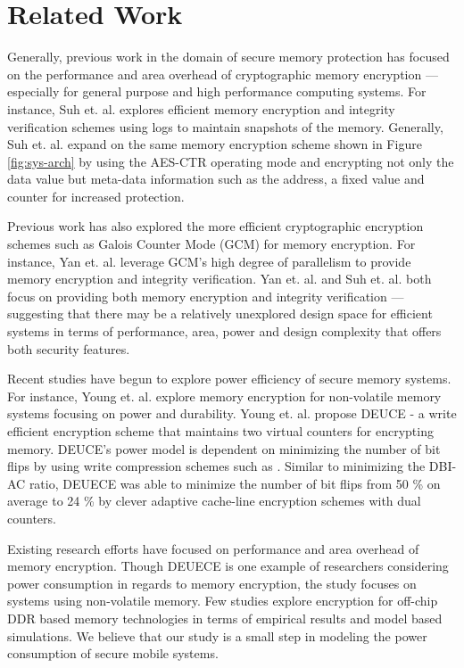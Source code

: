 \section{Related Work}
\label{sec-related}

Generally, previous work in the domain of secure memory protection has focused
on the performance and area overhead of cryptographic memory encryption ---
especially for general purpose and high performance computing systems. For
instance, Suh et. al. \cite{suh-memIntEnc} explores efficient memory encryption
and integrity verification schemes using logs to maintain snapshots of the
memory. Generally, Suh et. al. \cite{suh-memIntEnc} expand on the same memory
encryption scheme shown in Figure \ref{fig:sys-arch} by using the AES-CTR
operating mode and encrypting not only the data value but meta-data information
such as the address, a fixed value and counter for increased protection.

Previous work has also explored the more efficient cryptographic encryption
schemes such as Galois Counter Mode (GCM) \cite{nistGCM} for memory encryption.
For instance, Yan et. al. \cite{gcmMem} leverage GCM's high degree of
parallelism to provide memory encryption and integrity verification. Yan et.
al. and Suh et. al. both focus on providing both memory encryption and
integrity verification --- suggesting that there may be a relatively unexplored
design space for efficient systems in terms of performance, area, power and
design complexity that offers both security features.

Recent studies have begun to explore power efficiency of secure memory systems.
For instance, Young et. al. \cite{duece} explore memory encryption for
non-volatile memory systems focusing on power and durability. Young et. al.
propose DEUCE - a write efficient encryption scheme that maintains two virtual
counters for encrypting memory. DEUCE's power model is dependent on minimizing
the number of bit flips by using write compression schemes such as
 \cite{fnw}. Similar to minimizing the DBI-AC ratio, DEUECE
was able to minimize the number of bit flips from 50 \% on average to 24 \% by
clever adaptive cache-line encryption schemes with dual counters.

Existing research efforts have focused on performance and area overhead of
memory encryption. Though DEUECE is one example of researchers considering
power consumption in regards to memory encryption, the study focuses on systems
using non-volatile memory. Few studies explore encryption for off-chip DDR
based memory technologies in terms of empirical results and model based
simulations. We believe that our study is a small step in modeling the power
consumption of secure mobile systems.
